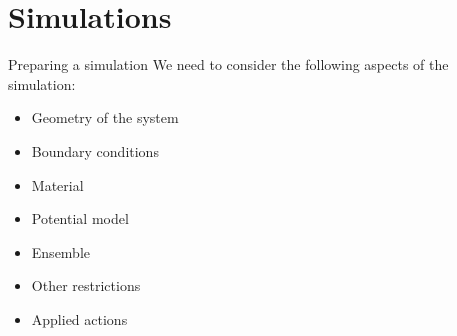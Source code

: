 \documentclass{beamer}
\begin{document}
\section{Simulations}
\begin{frame}{Preparing a simulation}
	We need to consider the following aspects of the simulation:
	\begin{itemize}
		\item Geometry of the system
		\item Boundary conditions
		\item Material
		\item Potential model
		\item Ensemble
		\item Other restrictions
		\item Applied actions
	\end{itemize}
\end{frame}
\end{document}
